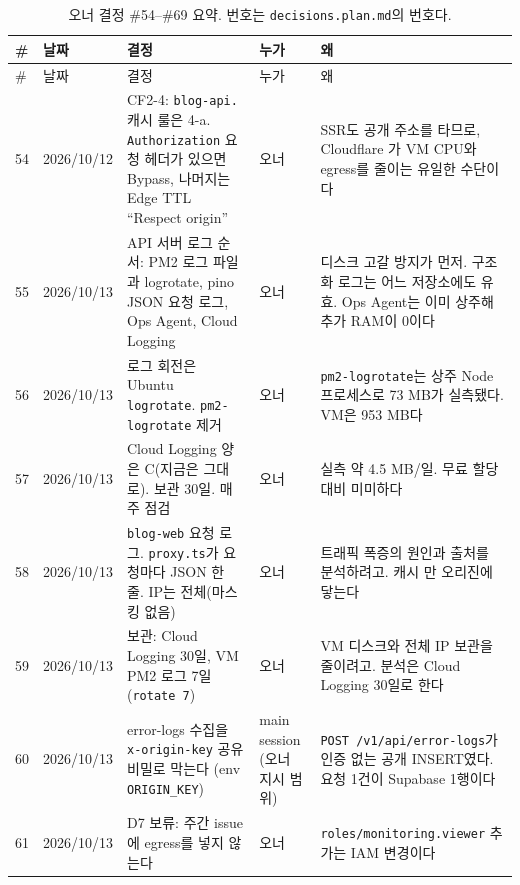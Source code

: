 \footnotesize
\begin{longtable}{L{0.8cm} L{1.9cm} L{5.2cm} L{1.5cm} L{4.3cm}}
  \caption{오너 결정 \#54--\#69 요약. 번호는 \texttt{decisions.plan.md}의 번호다.}\label{tab:08-decisions}\\
  \toprule
  \# & 날짜 & 결정 & 누가 & 왜 \\
  \midrule
  \endfirsthead
  \toprule
  \# & 날짜 & 결정 & 누가 & 왜 \\
  \midrule
  \endhead
  \bottomrule
  \endfoot
  54 & 2026/10/12 & CF2-4: \texttt{blog-api.} 캐시 룰은 4-a. \texttt{Authorization} 요청 헤더가 있으면 Bypass, 나머지는 Edge TTL ``Respect origin'' & 오너 & SSR도 공개 주소를 타므로, Cloudflare 가 VM CPU와 egress를 줄이는 유일한 수단이다 \\
  \midrule
  55 & 2026/10/13 & API 서버 로그 순서: PM2 로그 파일과 logrotate, pino JSON 요청 로그, Ops Agent, Cloud Logging & 오너 & 디스크 고갈 방지가 먼저. 구조화 로그는 어느 저장소에도 유효. Ops Agent는 이미 상주해 추가 RAM이 0이다 \\
  \midrule
  56 & 2026/10/13 & 로그 회전은 Ubuntu \texttt{logrotate}. \texttt{pm2-logrotate} 제거 & 오너 & \texttt{pm2-logrotate}는 상주 Node 프로세스로 73 MB가 실측됐다. VM은 953 MB다 \\
  \midrule
  57 & 2026/10/13 & Cloud Logging 양은 C(지금은 그대로). 보관 30일. 매주 점검 & 오너 & 실측 약 4.5 MB/일. 무료 할당 대비 미미하다 \\
  \midrule
  58 & 2026/10/13 & \texttt{blog-web} 요청 로그. \texttt{proxy.ts}가 요청마다 JSON 한 줄. IP는 전체(마스킹 없음) & 오너 & 트래픽 폭증의 원인과 출처를 분석하려고. 캐시 만 오리진에 닿는다 \\
  \midrule
  59 & 2026/10/13 & 보관: Cloud Logging 30일, VM PM2 로그 7일 (\texttt{rotate 7}) & 오너 & VM 디스크와 전체 IP 보관을 줄이려고. 분석은 Cloud Logging 30일로 한다 \\
  \midrule
  60 & 2026/10/13 & error-logs 수집을 \texttt{x-origin-key} 공유 비밀로 막는다 (env \texttt{ORIGIN\_KEY}) & main session (오너 지시 범위) & \texttt{POST /v1/api/error-logs}가 인증 없는 공개 INSERT였다. 요청 1건이 Supabase 1행이다 \\
  \midrule
  61 & 2026/10/13 & D7 보류: 주간 issue에 egress를 넣지 않는다 & 오너 & \texttt{roles/monitoring.viewer} 추가는 IAM 변경이다 \\

\end{longtable}
